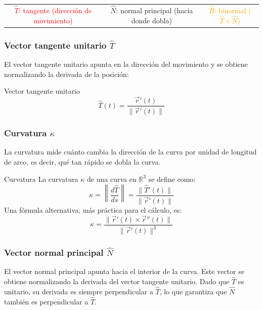 \begin{center}
{\footnotesize
\begin{tabular}{ccc}
    \textcolor{red}{$\hat{T}$: tangente (dirección de movimiento)} &
    \textcolor{green!60!black}{$\hat{N}$: normal principal (hacia donde dobla)} &
    \textcolor{orange}{$\hat{B}$: binormal ($\hat{T}\times\hat{N}$)}
\end{tabular}
}
\end{center}

\subsubsection{Vector tangente unitario $\hat{T}$}

El vector tangente unitario apunta en la dirección del movimiento y se obtiene normalizando la derivada de la posición:

\begin{mydefinition}{Vector tangente unitario}
\[ \hat{T}(t) = \frac{\vec{r}'(t)}{\|\vec{r}'(t)\|} \]
\end{mydefinition}

\subsubsection{Curvatura $\kappa$}

La curvatura mide cuánto cambia la dirección de la curva por unidad de longitud de arco, es decir, qué tan rápido se dobla la curva.

\begin{mydefinition}{Curvatura}
La curvatura $\kappa$ de una curva en $\mathbb{R}^3$ se define como:
\[ \kappa = \left\|\frac{d\hat{T}}{ds}\right\| = \frac{\|\hat{T}'(t)\|}{\|\vec{r}'(t)\|} \]
Una fórmula alternativa, más práctica para el cálculo, es:
\[ \kappa = \frac{\|\vec{r}'(t) \times \vec{r}''(t)\|}{\|\vec{r}'(t)\|^3} \]
\end{mydefinition}


\subsubsection{Vector normal principal $\hat{N}$}

El vector normal principal apunta hacia el interior de la curva. Este vector se obtiene normalizando la derivada del vector tangente unitario. Dado que $\hat{T}$ es unitario, su derivada es siempre perpendicular a $\hat{T}$, lo que garantiza que $\hat{N}$ también es perpendicular a $\hat{T}$.


